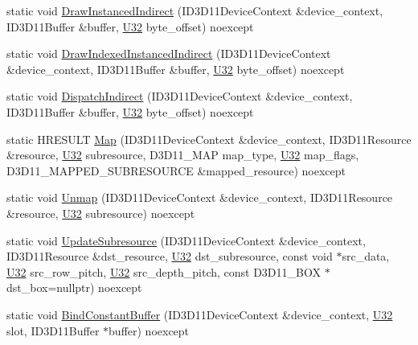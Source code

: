 \begin{DoxyCompactItemize}
\item 
static void \hyperlink{structmage_1_1rendering_1_1_pipeline_acfdf1d2aba1e8c0db9c4ef9e9730f31c}{Draw\+Instanced\+Indirect} (I\+D3\+D11\+Device\+Context \&device\+\_\+context, I\+D3\+D11\+Buffer \&buffer, \hyperlink{namespacemage_a41c104c036fba3756a74e19f793eeaa1}{U32} byte\+\_\+offset) noexcept
\item 
static void \hyperlink{structmage_1_1rendering_1_1_pipeline_a51e2744827cbcf7791fcb40c0131d11b}{Draw\+Indexed\+Instanced\+Indirect} (I\+D3\+D11\+Device\+Context \&device\+\_\+context, I\+D3\+D11\+Buffer \&buffer, \hyperlink{namespacemage_a41c104c036fba3756a74e19f793eeaa1}{U32} byte\+\_\+offset) noexcept
\item 
static void \hyperlink{structmage_1_1rendering_1_1_pipeline_aceae5a9f2d24336e4424208a8e037a82}{Dispatch\+Indirect} (I\+D3\+D11\+Device\+Context \&device\+\_\+context, I\+D3\+D11\+Buffer \&buffer, \hyperlink{namespacemage_a41c104c036fba3756a74e19f793eeaa1}{U32} byte\+\_\+offset) noexcept
\item 
static H\+R\+E\+S\+U\+LT \hyperlink{structmage_1_1rendering_1_1_pipeline_ab0176557cd5473bf5cd77836ca2d924f}{Map} (I\+D3\+D11\+Device\+Context \&device\+\_\+context, I\+D3\+D11\+Resource \&resource, \hyperlink{namespacemage_a41c104c036fba3756a74e19f793eeaa1}{U32} subresource, D3\+D11\+\_\+\+M\+AP map\+\_\+type, \hyperlink{namespacemage_a41c104c036fba3756a74e19f793eeaa1}{U32} map\+\_\+flags, D3\+D11\+\_\+\+M\+A\+P\+P\+E\+D\+\_\+\+S\+U\+B\+R\+E\+S\+O\+U\+R\+CE \&mapped\+\_\+resource) noexcept
\item 
static void \hyperlink{structmage_1_1rendering_1_1_pipeline_ac4ad95111168cc62686da885da9ab161}{Unmap} (I\+D3\+D11\+Device\+Context \&device\+\_\+context, I\+D3\+D11\+Resource \&resource, \hyperlink{namespacemage_a41c104c036fba3756a74e19f793eeaa1}{U32} subresource) noexcept
\item 
static void \hyperlink{structmage_1_1rendering_1_1_pipeline_ae1de65a4f77e4db1fe0582ab85ef1335}{Update\+Subresource} (I\+D3\+D11\+Device\+Context \&device\+\_\+context, I\+D3\+D11\+Resource \&dst\+\_\+resource, \hyperlink{namespacemage_a41c104c036fba3756a74e19f793eeaa1}{U32} dst\+\_\+subresource, const void $\ast$src\+\_\+data, \hyperlink{namespacemage_a41c104c036fba3756a74e19f793eeaa1}{U32} src\+\_\+row\+\_\+pitch, \hyperlink{namespacemage_a41c104c036fba3756a74e19f793eeaa1}{U32} src\+\_\+depth\+\_\+pitch, const D3\+D11\+\_\+\+B\+OX $\ast$dst\+\_\+box=nullptr) noexcept
\item 
static void \hyperlink{structmage_1_1rendering_1_1_pipeline_a983ebf1363c8d3edd6830576e2258e48}{Bind\+Constant\+Buffer} (I\+D3\+D11\+Device\+Context \&device\+\_\+context, \hyperlink{namespacemage_a41c104c036fba3756a74e19f793eeaa1}{U32} slot, I\+D3\+D11\+Buffer $\ast$buffer) noexcept

\end{DoxyCompactItemize}
